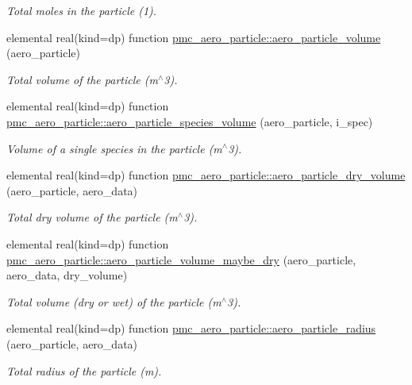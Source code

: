 \begin{DoxyCompactItemize}
\begin{DoxyCompactList}\small\item\em Total moles in the particle (1). \end{DoxyCompactList}\item 
elemental real(kind=dp) function \mbox{\hyperlink{namespacepmc__aero__particle_a432c6796b18e1d002b7164eeba6560f0}{pmc\+\_\+aero\+\_\+particle\+::aero\+\_\+particle\+\_\+volume}} (aero\+\_\+particle)
\begin{DoxyCompactList}\small\item\em Total volume of the particle (m$^\wedge$3). \end{DoxyCompactList}\item 
elemental real(kind=dp) function \mbox{\hyperlink{namespacepmc__aero__particle_a978fa20bca2318ae8f14c3917406abcb}{pmc\+\_\+aero\+\_\+particle\+::aero\+\_\+particle\+\_\+species\+\_\+volume}} (aero\+\_\+particle, i\+\_\+spec)
\begin{DoxyCompactList}\small\item\em Volume of a single species in the particle (m$^\wedge$3). \end{DoxyCompactList}\item 
elemental real(kind=dp) function \mbox{\hyperlink{namespacepmc__aero__particle_a62de3ac045c2de8e165b3adb79f51ef3}{pmc\+\_\+aero\+\_\+particle\+::aero\+\_\+particle\+\_\+dry\+\_\+volume}} (aero\+\_\+particle, aero\+\_\+data)
\begin{DoxyCompactList}\small\item\em Total dry volume of the particle (m$^\wedge$3). \end{DoxyCompactList}\item 
elemental real(kind=dp) function \mbox{\hyperlink{namespacepmc__aero__particle_aa07ec8ccef0daf01ab96339f823eb677}{pmc\+\_\+aero\+\_\+particle\+::aero\+\_\+particle\+\_\+volume\+\_\+maybe\+\_\+dry}} (aero\+\_\+particle, aero\+\_\+data, dry\+\_\+volume)
\begin{DoxyCompactList}\small\item\em Total volume (dry or wet) of the particle (m$^\wedge$3). \end{DoxyCompactList}\item 
elemental real(kind=dp) function \mbox{\hyperlink{namespacepmc__aero__particle_a9f3e4a32d7345bfdcfbf2c1bed7230dc}{pmc\+\_\+aero\+\_\+particle\+::aero\+\_\+particle\+\_\+radius}} (aero\+\_\+particle, aero\+\_\+data)
\begin{DoxyCompactList}\small\item\em Total radius of the particle (m). \end{DoxyCompactList}\item 

\end{DoxyCompactItemize}
